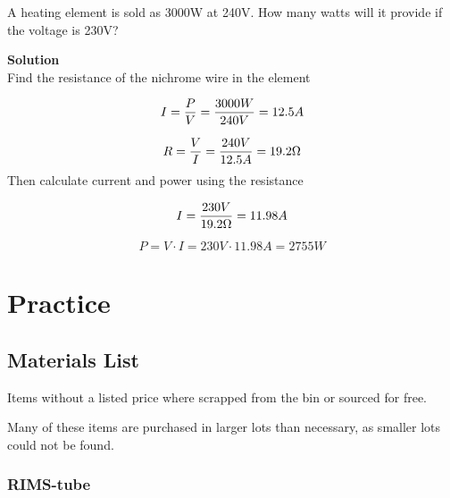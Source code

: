 \documentclass[11pt,fleqn]{book} %
\begin{document}
\begin{exercise}
A heating element is sold as 3000W at 240V. How many watts will it provide if the voltage is 230V?

\textbf{Solution}\\
Find the resistance of the nichrome wire in the element

\begin{equation*}
I = {P \over V} = {3000W \over 240V} = 12.5A
\end{equation*}

\begin{equation*}
R = {V \over I} = {240V \over 12.5A} = 19.2 \Omega
\end{equation*}
Then calculate current and power using the resistance

\begin{equation*}
I = {230V \over 19.2 \Omega} = 11.98A
\end{equation*}

\begin{equation*}
P = V \cdot I = 230V \cdot 11.98A = 2755W
\end{equation*}

\end{exercise}


\part{Practice}



\chapter{Materials List}

Items without a listed price where scrapped from the bin or sourced for free.

Many of these items are purchased in larger lots than necessary, as smaller lots could not be found.

\section{RIMS-tube}
\end{document}
